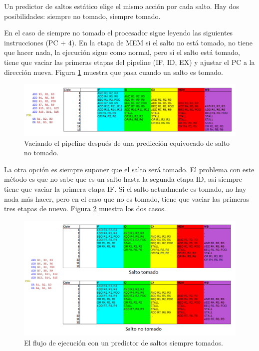 \documentclass[a4paper]{article}
\begin{document}
Un predictor de saltos estático elige el mismo acción por cada salto. Hay dos posibilidades: siempre no tomado, siempre tomado.

En el caso de siempre no tomado el procesador sigue leyendo las siguientes instrucciones (PC + 4). En la etapa de MEM si el salto no está tomado, no tiene que hacer nada, la ejecución sigue como normal, pero si el salto está tomado, tiene que vaciar las primeras etapas del pipeline (IF, ID, EX) y ajustar el PC a la dirección nueva. Figura \ref{fig:assume_not_taken_wrong} muestra que pasa cuando un salto es tomado.

\begin{figure}[!htb]
\centering
\includegraphics[scale=0.4]{./img/assume_not_taken_wrong}
\caption{Vaciando el pipeline después de una predicción equivocado de salto no tomado.}
\label{fig:assume_not_taken_wrong}
\end{figure}

La otra opción es siempre suponer que el salto será tomado. El problema con este método es que no sabe que es un salto hasta la segunda etapa ID, así siempre tiene que vaciar la primera etapa IF. Si el salto actualmente es tomado, no hay nada más hacer, pero en el caso que no es tomado, tiene que vaciar las primeras tres etapas de nuevo. Figura \ref{fig:assume_taken} muestra los dos casos.

\begin{figure}[!htb]
\centering
\includegraphics[scale=0.4]{./img/assume_taken}
\caption{El flujo de ejecución con un predictor de saltos siempre tomados.}
\label{fig:assume_taken}
\end{figure}
\end{document}
